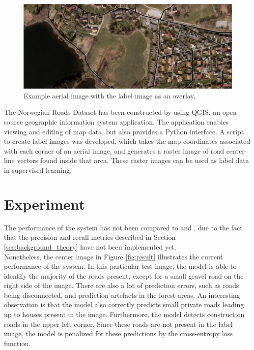 \begin{figure}[t]
\begin{center}
\includegraphics[width=1\columnwidth]{figs/norwegian_dataset.png}
\caption[Norwegian road dataset example]{Example aerial image with the label image as an overlay.}
\label{fig:aerialimage_norwegian}
\end{center}
\end{figure}

The Norwegian Roads Dataset has been constructed by using QGIS, an open source geographic information system application. The application enables viewing and editing of map data, but also provides a Python interface. A script to create label images was developed, which takes the map coordinates associated with each corner of an aerial image, and generates a raster image of road center-line vectors found inside that area. These raster images can be used as label data in supervised learning. \\


\section{Experiment}
\label{sec:Experiment}
The performance of the system has not been compared to \citep{saito_building_and_roads} and \citep{Mnih_aerial_images_noisy}, due to the fact that the precision and recall metrics described in Section \ref{sec:background_theory} have not been implemented yet.\\

Nonetheless, the center image in Figure \ref{fig:result} illustrates the current performance of the system. In this particular test image, the model is able to identify the majority of the roads present, except for a small gravel road on the right side of the image. There are also a lot of prediction errors, such as roads being disconnected, and prediction artefacts in the forest areas. An interesting observation is that the model also correctly predicts small private roads leading up to houses present in the image. Furthermore, the model detects construction roads in the upper left corner. Since these roads are not present in the label image, the model is penalized for these predictions by the cross-entropy loss function.\\


